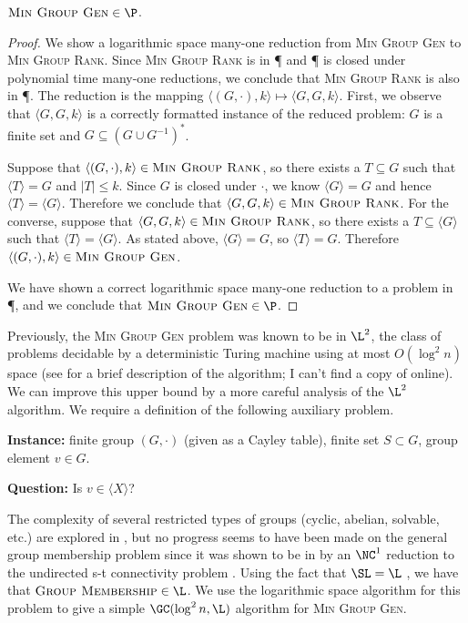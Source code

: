 \documentclass{article}
\newcommand{\gen}[1]{{\langle #1 \rangle}}
\begin{document}
\begin{lemma}\label{lem:mingenp}
  $\textsc{Min Group Gen} \in \P$.
\end{lemma}
\begin{proof}
  We show a logarithmic space many-one reduction from \textsc{Min Group Gen} to \textsc{Min Group Rank}.
  Since \textsc{Min Group Rank} is in \P{} and \P{} is closed under polynomial time many-one reductions, we conclude that \textsc{Min Group Rank} is also in \P.
  The reduction is the mapping $\langle (G, \cdot), k \rangle \mapsto \langle G, G, k \rangle$.
  First, we observe that $\langle G, G, k \rangle$ is a correctly formatted instance of the reduced problem: $G$ is a finite set and $G \subseteq (G \cup G^{-1})^*$.

  Suppose that $\langle (G, \cdot), k \rangle \in \textsc{Min Group Rank}$, so there exists a $T \subseteq G$ such that $\gen{T} = G$ and $|T| \leq k$.
  Since $G$ is closed under $\cdot$, we know $\gen{G} = G$ and hence $\gen{T} = \gen{G}$.
  Therefore we conclude that $\langle G, G, k \rangle \in \textsc{Min Group Rank}$.
  For the converse, suppose that $\langle G, G, k \rangle \in \textsc{Min Group Rank}$, so there exists a $T \subseteq \gen{G}$ such that $\gen{T} = \gen{G}$.
  As stated above, $\gen{G} = G$, so $\gen{T} = G$.
  Therefore $\langle (G, \cdot), k \rangle \in \textsc{Min Group Gen}$.

  We have shown a correct logarithmic space many-one reduction to a problem in \P, and we conclude that $\textsc{Min Group Gen} \in \P$.
\end{proof}

Previously, the \textsc{Min Group Gen} problem was known to be in $\L^2$, the class of problems decidable by a deterministic Turing machine using at most $O(\log^2 n)$ space \cite{lsz77} (see \cite[Proposition~3]{at06} for a brief description of the algorithm; I can't find a copy of \cite{lsz77} online).
We can improve this upper bound by a more careful analysis of the $\L^2$ algorithm.
We require a definition of the following auxiliary problem.

\begin{definition}
  \mbox{}

  \textbf{Instance:} finite group $(G, \cdot)$ (given as a Cayley table), finite set $S \subset G$, group element $v \in G$.

  \textbf{Question:} Is $v \in \gen{X}$?
\end{definition}

The complexity of several restricted types of groups (cyclic, abelian, solvable, etc.) are explored in \cite{bklm01}, but no progress seems to have been made on the general group membership problem since it was shown to be in \SL{} by an $\NC^1$ reduction to the undirected s-t connectivity problem \cite[Section~3]{bm89}.
Using the fact that $\SL = \L$ \cite{reingold08}, we have that $\textsc{Group Membership} \in \L$.
We use the logarithmic space algorithm for this problem to give a simple $\GC(\log^2 n, \L)$ algorithm for \textsc{Min Group Gen}.
\end{document}
